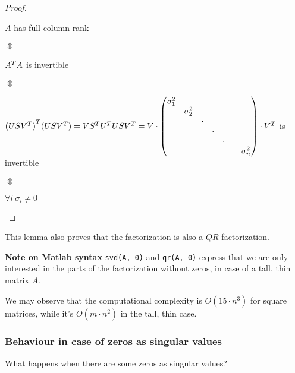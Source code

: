 \documentclass[computationalMathematics.tex]{subfiles}
\begin{document}
\begin{proof}
  \begin{center}
  $A$ has full column rank 
  
  $\Updownarrow$

  ${A}^{T}A$ is invertible
  
$\Updownarrow$
  
  ${(US{V}^{T})}^{T} (US{V}^{T}) = V{S}^{T}{U}^{T}US{V}^{T}
    = V \cdot  \begin{pmatrix}
    \sigma_{1}^2 & & & & &\\
    & \sigma_{2}^2 & & & &\\
    & & \cdot & & &\\
    & & & \cdot & &\\
    & & & & \cdot &\\
    & & & & & & \sigma_{n}^2\\ 
  \end{pmatrix} \cdot {V}^{T}$
  is invertible 
  
$\Updownarrow$
  
  $\forall i ~ \sigma_i \neq 0$
\end{center}
\end{proof}

\begin{obs}
This lemma also proves that the factorization is also a $QR$ factorization.
\end{obs}
\begin{myframe}{\bf Note on Matlab syntax}
  \texttt{svd(A, 0)} and \texttt{qr(A, 0)} express that we are only interested in the parts of the factorization without zeros, in case of a tall, thin matrix $A$.
\end{myframe}
 We may observe that the computational complexity is $O(15 \cdot n^3)$ for square matrices, while it's $O(m \cdot n^2)$ in the tall, thin case.

 \subsubsection{Behaviour in case of zeros as singular values}
 What happens when there are some zeros as singular values? 
 
\end{document}

